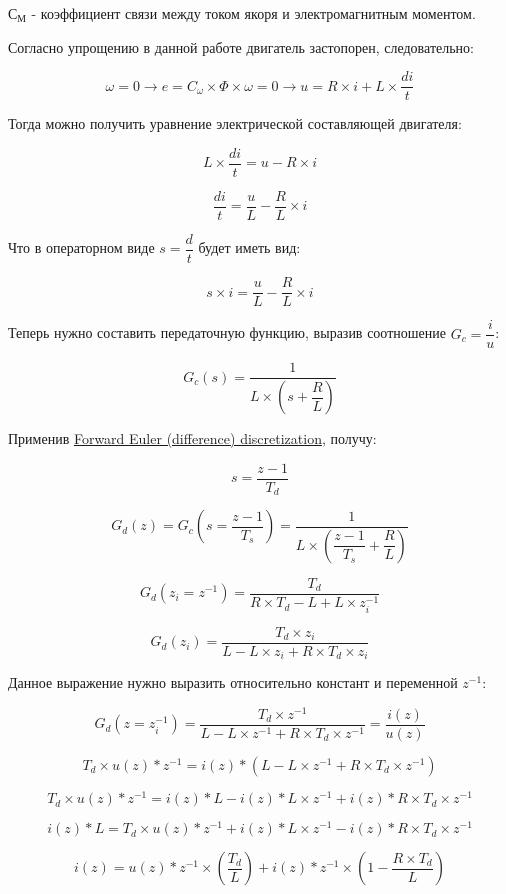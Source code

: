 \documentclass[12pt]{report}
\begin{document}
\(С_М\) - коэффициент связи между током якоря и электромагнитным
моментом.

    Согласно упрощению в данной работе двигатель застопорен, следовательно:

\[
\omega = 0 \to e = C_{\omega} \times \Phi \times \omega = 0 \to u = R \times i + L \times \dfrac{di}{t}
\]

Тогда можно получить уравнение электрической составляющей двигателя:

\[
L \times \dfrac{di}{t} = u  - R \times i
\]

\[
\dfrac{di}{t} = \dfrac{u}{L}  - \dfrac{R}{L} \times i
\]

Что в операторном виде \(s = \dfrac{d}{t}\) будет иметь вид:

\[
s \times i = \dfrac{u}{L}  - \dfrac{R}{L} \times i
\]

Теперь нужно составить передаточную функцию, выразив соотношение
\(G_c = \dfrac{i}{u}\):

\[
G_c(s) = \dfrac{1}{L \times (s + \dfrac{R}{L})}
\]

Применив
\href{https://x-engineer.org/discretizing-transfer-function/\#:~:text=Discretization\%20is\%20the\%20process\%20through,out\%20computing\%20and\%20control\%20tasks.}{Forward
Euler (difference) discretization}, получу:

\[
s = \dfrac{z - 1}{T_d}
\]

\[
G_d(z) = G_c(s=\dfrac{z - 1}{T_s}) = \dfrac{1}{L \times (\dfrac{z - 1}{T_s} + \dfrac{R}{L})}
\]

\[
G_d(z_i=z^{-1}) = \dfrac{T_d}{R \times T_d - L + L \times z_i^{-1}}
\]

\[
G_d(z_i) = \dfrac{T_d \times z_i}{L - L \times z_i + R \times T_d \times z_i}
\]

Данное выражение нужно выразить относительно констант и переменной
\(z^{-1}\):

\[
G_d(z=z_i^{-1}) = \dfrac{T_d \times z^{-1}}{L - L \times z^{-1} + R \times T_d \times z^{-1}} = \dfrac{i(z)}{u(z)}
\]

\[
T_d \times u(z)*z^{-1} = i(z)*(L - L \times z^{-1} + R \times T_d \times z^{-1})
\]

\[
T_d \times u(z)*z^{-1} = i(z)*L - i(z)*L \times z^{-1} + i(z)*R \times T_d \times z^{-1}
\]

\[
i(z)*L = T_d \times u(z)*z^{-1} + i(z)*L \times z^{-1} - i(z)*R \times T_d \times z^{-1}
\]

\[
i(z) = u(z)*z^{-1} \times (\dfrac{T_d}{L}) + i(z)*z^{-1} \times (1 - \dfrac{R \times T_d}{L})
\]
\end{document}
